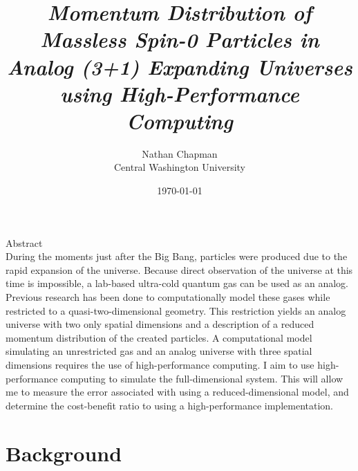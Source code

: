 \documentclass{article}
\title{\Large \vspace{-0.625in} \emph{Momentum Distribution of Massless Spin-0 Particles in Analog (3+1) Expanding Universes using High-Performance Computing} \vspace{-0.15in}}
\author{Nathan Chapman \\ {\normalsize Central Washington University}}
\date{\vspace{-0.1in}\today}
\begin{document}
    \maketitle
    
    \begin{center}
        Abstract \\
        During the moments just after the Big Bang, particles were produced due to the rapid expansion of the universe. Because direct observation of the universe at this time is impossible, a lab-based ultra-cold quantum gas can be used as an analog.  Previous research has been done to computationally model these gases while restricted to a quasi-two-dimensional geometry.  This restriction yields an analog universe with two only spatial dimensions and a description of a reduced momentum distribution of the created particles.  A computational model simulating an unrestricted gas and an analog universe with three spatial dimensions requires the use of high-performance computing.  I aim to use high-performance computing to simulate the full-dimensional system. This will allow me to measure the error associated with using a reduced-dimensional model, and determine the cost-benefit ratio to using a high-performance implementation.
            
            
            
    \end{center}
    
    \section{Background}
\end{document}
